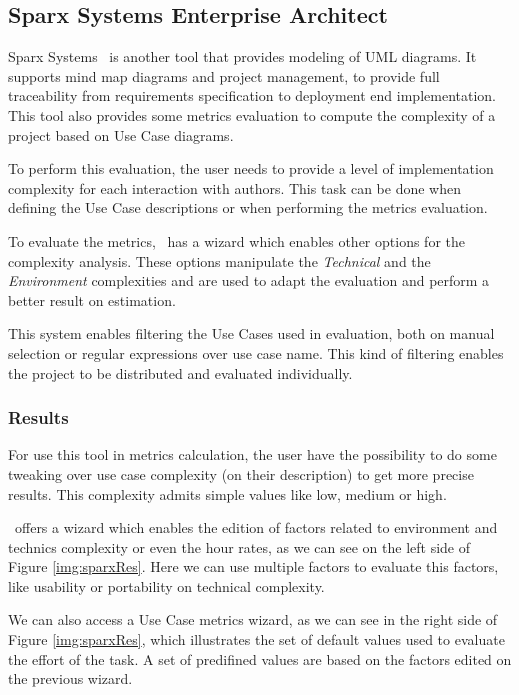 \subsection{Sparx Systems Enterprise Architect}
Sparx Systems \entArch~is another tool that provides modeling of UML diagrams.
It supports mind map diagrams and project management, to provide full traceability from requirements specification to deployment end implementation.
This tool also provides some metrics evaluation to compute the complexity of a project based on Use Case diagrams. 

To perform this evaluation, the user needs to provide a level of implementation complexity for each interaction with authors. 
This task can be done when defining the Use Case descriptions or when performing the metrics evaluation.

To evaluate the metrics, \entArch~has a wizard which enables other options for the complexity analysis.
These options manipulate the \emph{Technical} and the \emph{Environment} complexities and are used to adapt the evaluation and perform a better result on estimation.

This system enables filtering the Use Cases used in evaluation, both on manual selection or regular expressions over use case name.
This kind of filtering enables the project to be distributed and evaluated individually.

\subsubsection{Results}
For use this tool in metrics calculation, the user have the possibility to do some tweaking over use case complexity (on their description) to get more precise results.
This complexity admits simple values like low, medium or high.

\entArch~offers a wizard which enables the edition of factors related to environment and technics complexity or even the hour rates, as we can see on the left side of Figure \ref{img:sparxRes}.
Here we can use multiple factors to evaluate this factors, like usability or portability on technical complexity.

We can also access a Use Case metrics wizard, as we can see in the right side of Figure \ref{img:sparxRes}, which illustrates the set of default values used to evaluate the effort of the task.
A set of predifined values are based on the factors edited on the previous wizard.


